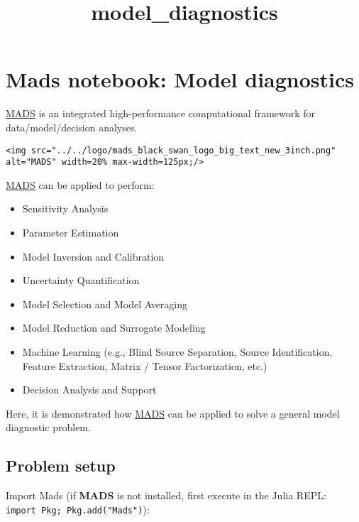 \documentclass[11pt]{article}
\title{model\_diagnostics}
\providecommand{\tightlist}{%
      \setlength{\itemsep}{0pt}\setlength{\parskip}{0pt}}
\begin{document}
    
    \maketitle
    
    

    
    \hypertarget{mads-notebook-model-diagnostics}{%
\section{Mads notebook: Model
diagnostics}\label{mads-notebook-model-diagnostics}}

\href{http://madsjulia.github.io/Mads.jl}{MADS} is an integrated
high-performance computational framework for data/model/decision
analyses.

\begin{verbatim}
<img src="../../logo/mads_black_swan_logo_big_text_new_3inch.png" alt="MADS" width=20% max-width=125px;/>
\end{verbatim}

\href{http://madsjulia.github.io/Mads.jl}{MADS} can be applied to
perform:

\begin{itemize}
\tightlist
\item
  Sensitivity Analysis
\item
  Parameter Estimation
\item
  Model Inversion and Calibration
\item
  Uncertainty Quantification
\item
  Model Selection and Model Averaging
\item
  Model Reduction and Surrogate Modeling
\item
  Machine Learning (e.g., Blind Source Separation, Source
  Identification, Feature Extraction, Matrix / Tensor Factorization,
  etc.)
\item
  Decision Analysis and Support
\end{itemize}

Here, it is demonstrated how
\href{http://madsjulia.github.io/Mads.jl}{MADS} can be applied to solve
a general model diagnostic problem.

\hypertarget{problem-setup}{%
\subsection{Problem setup}\label{problem-setup}}

Import Mads (if \textbf{MADS} is not installed, first execute in the
Julia REPL: \texttt{import\ Pkg;\ Pkg.add("Mads")}):
\end{document}
